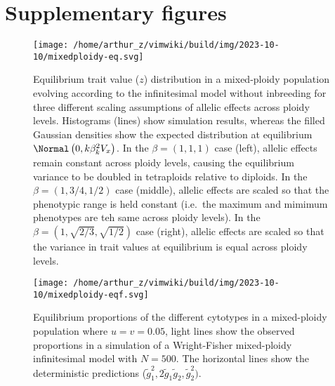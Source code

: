 \hypertarget{supplementary-figures}{%
\section{Supplementary figures}\label{supplementary-figures}}

\clearpage

\begin{figure}
\hypertarget{fig:z}{%
\centering
\texttt{[image: /home/arthur\_z/vimwiki/build/img/2023-10-10/mixedploidy-eq.svg]}
\caption{Equilibrium trait value (\(z\)) distribution in a mixed-ploidy
population evolving according to the infinitesimal model without
inbreeding for three different scaling assumptions of allelic effects
across ploidy levels. Histograms (lines) show simulation results,
whereas the filled Gaussian densities show the expected distribution at
equilibrium \(\Normal\left(0, k\beta_k^2V_x\right)\). In the
\(\beta=(1,1,1)\) case (left), allelic effects remain constant across
ploidy levels, causing the equilibrium variance to be doubled in
tetraploids relative to diploids. In the \(\beta=(1, 3/4, 1/2)\) case
(middle), allelic effects are scaled so that the phenotypic range is
held constant (i.e.~the maximum and mimimum phenotypes are teh same
across ploidy levels). In the \(\beta=(1, \sqrt{2/3}, \sqrt{1/2})\) case
(right), allelic effects are scaled so that the variance in trait values
at equilibrium is equal across ploidy levels.}\label{fig:z}
}
\end{figure}

\begin{figure}
\hypertarget{fig:eqp}{%
\centering
\texttt{[image: /home/arthur\_z/vimwiki/build/img/2023-10-10/mixedploidy-eqf.svg]}
\caption{Equilibrium proportions of the different cytotypes in a
mixed-ploidy population where \(u=v=0.05\), light lines show the
observed proportions in a simulation of a Wright-Fisher mixed-ploidy
infinitesimal model with \(N=500\). The horizontal lines show the
deterministic predictions
(\(\tilde{g}_1^2, 2\tilde{g}_1\tilde{g}_2, \tilde{g}_2^2)\).}\label{fig:eqp}
}
\end{figure}

